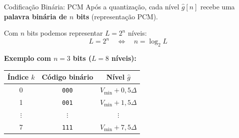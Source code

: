 
\begin{frame}{Codificação Binária: PCM}
  Após a quantização, cada nível $\hat{g}[n]$ recebe uma
  \textbf{palavra binária de $n$ bits} (representação PCM).

  \vspace{0.2cm}
  Com $n$ bits podemos representar $L = 2^n$ níveis:
  \[
    L = 2^n
    \quad\Longleftrightarrow\quad
    n = \log_2 L
  \]

  \vspace{0.15cm}
  \textbf{Exemplo com $n = 3$ bits ($L = 8$ níveis):}

  \vspace{0.1cm}
  \begin{center}
  \begin{tabular}{ccc}
    \hline
    Índice $k$ & Código binário & Nível $\hat{g}$\\
    \hline
    0 & \texttt{000} & $V_{\min} + 0{,}5\Delta$ \\
    1 & \texttt{001} & $V_{\min} + 1{,}5\Delta$ \\
    $\vdots$ & $\vdots$ & $\vdots$ \\
    7 & \texttt{111} & $V_{\min} + 7{,}5\Delta$ \\
    \hline
  \end{tabular}
  \end{center}
\end{frame}


